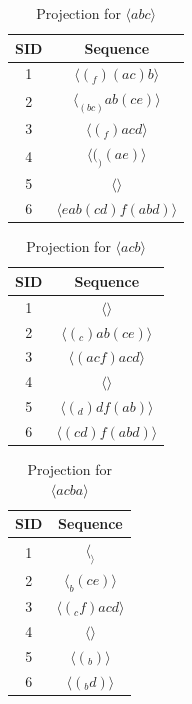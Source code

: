 \documentclass[11pt]{article}
\begin{document}
\begin{table}[]
    \centering
    \begin{tabular}{|c|c|} \hline
       SID  & Sequence  \\ \hline
       1 & $\langle (_f)(ac)b \rangle$\\ \hline
       2 & $\langle _(bc)ab(ce) \rangle$ \\ \hline
       3 & $\langle (_f)acd \rangle$ \\ \hline
       4 & $\langle (_)(ae) \rangle$ \\ \hline
       5 & $\langle  \rangle$\\ \hline
       6 & $\langle eab(cd)f(abd) \rangle$ \\ \hline
    \end{tabular}
    \caption{Projection for $\langle abc\rangle$}
    \label{tab:abc}
\end{table}
\begin{table}[]
    \centering
    \begin{tabular}{|c|c|} \hline
       SID  & Sequence  \\ \hline
       1 & $\langle  \rangle$\\ \hline
       2 & $\langle (_c)ab(ce) \rangle$ \\ \hline
       3 & $\langle (acf)acd \rangle$ \\ \hline
       4 & $\langle  \rangle$ \\ \hline
       5 & $\langle (_d)df(ab) \rangle$\\ \hline
       6 & $\langle (cd)f(abd) \rangle$ \\ \hline
    \end{tabular}
    \caption{Projection for $\langle acb \rangle$}
    \label{tab:acb}
\end{table}
\begin{table}[]
    \centering
    \begin{tabular}{|c|c|} \hline
       SID  & Sequence  \\ \hline
       1 & $\langle _ \rangle$\\ \hline
       2 & $\langle _b(ce) \rangle$ \\ \hline
       3 & $\langle (_cf)acd \rangle$ \\ \hline
       4 & $\langle  \rangle$ \\ \hline
       5 & $\langle (_b) \rangle$\\ \hline
       6 & $\langle (_bd)  \rangle$ \\ \hline
    \end{tabular}
    \caption{Projection for $\langle acba\rangle$}
    \label{tab:acba}
\end{table}
\end{document}
